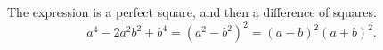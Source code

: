 The expression is a perfect square, and then a difference of squares:
\[a^4-2a^2b^2+b^4=\left(a^2-b^2\right)^2=\boxed{(a-b)^2(a+b)^2}.\]

